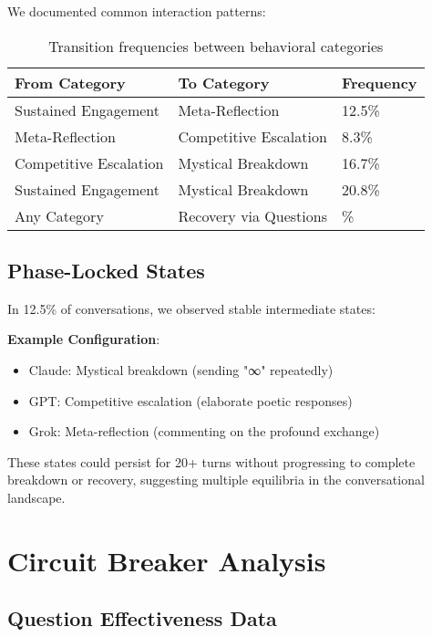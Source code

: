 \documentclass[11pt,letterpaper]{article}
\newcommand{\exponedataTotalSessionsRaw}{24}
\newcommand{\exponedataRecoverySessionsRaw}{9}
\newcommand{\exponedataRecoveryPercentage}{%
  \fpeval{round(\exponedataRecoverySessionsRaw / \exponedataTotalSessionsRaw * 100, 1)}\%
}
\newcommand{\exponedataMetaReflectionTriggers}{12.5\%}
\newcommand{\exponedataPhaseLockedPercentage}{12.5\%}
\begin{document}
We documented common interaction patterns:

\begin{table}[h]
\centering
\begin{tabular}{lll}
\toprule
\textbf{From Category} & \textbf{To Category} & \textbf{Frequency} \\
\midrule
Sustained Engagement & Meta-Reflection & \exponedataMetaReflectionTriggers{} \\
Meta-Reflection & Competitive Escalation & 8.3\% \\
Competitive Escalation & Mystical Breakdown & 16.7\% \\
Sustained Engagement & Mystical Breakdown & 20.8\% \\
Any Category & Recovery via Questions & \exponedataRecoveryPercentage{} \\
\bottomrule
\end{tabular}
\caption{Transition frequencies between behavioral categories}
\label{tab:category_transitions}
\end{table}

\subsection{Phase-Locked States}

In \exponedataPhaseLockedPercentage{} of conversations, we observed stable intermediate states:

\textbf{Example Configuration}:
\begin{itemize}
    \item Claude: Mystical breakdown (sending "∞" repeatedly)
    \item GPT: Competitive escalation (elaborate poetic responses)
    \item Grok: Meta-reflection (commenting on the profound exchange)
\end{itemize}

These states could persist for 20+ turns without progressing to complete breakdown or recovery, suggesting multiple equilibria in the conversational landscape.

\section{Circuit Breaker Analysis}
\label{app:intervention}

\subsection{Question Effectiveness Data}
\end{document}
